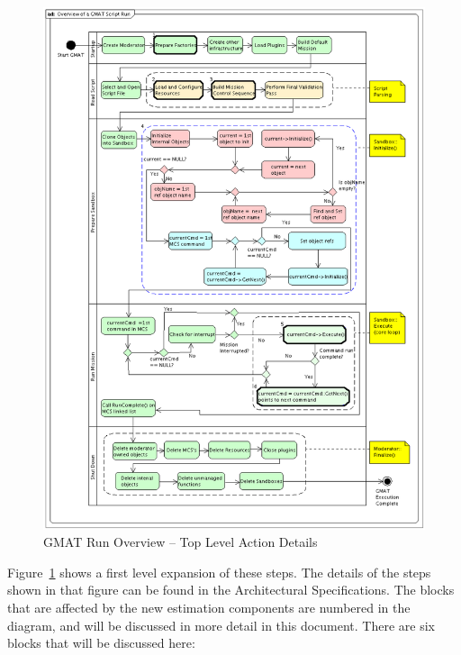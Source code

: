 \begin{figure}[htbp]
\begin{center}
\includegraphics[scale=0.5]{Images/OverviewofaGMATScriptRun.eps}
\caption{\label{fig:RunScriptDetails}GMAT Run Overview -- Top Level Action Details}
\end{center}
\end{figure}

Figure~\ref{fig:RunScriptDetails} shows a first level expansion of these steps.  The details of the
steps shown in that figure can be found in the Architectural Specifications.  The blocks that are
affected by the new estimation components are numbered in the diagram, and will be discussed in more
detail in this document. There are six blocks that will be discussed here:

